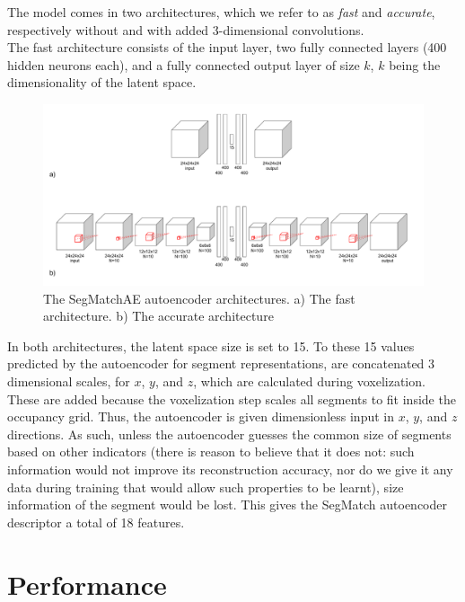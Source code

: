 The model comes in two architectures, which we refer to as \textit{fast} and \textit{accurate}, respectively without and with added 3-dimensional convolutions.\\

The fast architecture consists of the input layer, two fully connected layers (400 hidden neurons each), and a fully connected output layer of size $k$, $k$ being the dimensionality of the latent space.

\begin{figure}
  \centering
  \includegraphics[width=5.2in]{images/architecture.pdf}
  \caption{The SegMatchAE autoencoder architectures. a) The fast architecture. b) The accurate architecture}
  \label{fig:architecture}
\end{figure}

In both architectures, the latent space size is set to 15. To these 15 values predicted by the autoencoder for segment representations, are concatenated 3 dimensional scales, for $x$, $y$, and $z$, which are calculated during voxelization. These are added because the voxelization step scales all segments to fit inside the occupancy grid. Thus, the autoencoder is given dimensionless input in $x$, $y$, and $z$ directions. As such, unless the autoencoder guesses the common size of segments based on other indicators (there is reason to believe that it does not: such information would not improve its reconstruction accuracy, nor do we give it any data during training that would allow such properties to be learnt), size information of the segment would be lost. This gives the SegMatch autoencoder descriptor a total of 18 features.\\

\section{Performance}
\label{sec:ae-performance}

